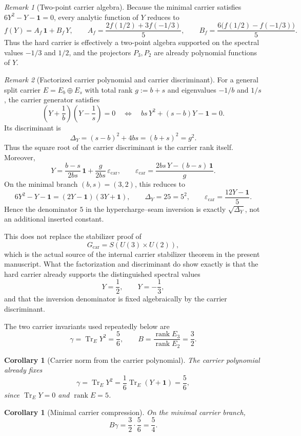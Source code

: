 \documentclass[11pt,a4paper]{article}
\newtheorem{corollary}[theorem]{Corollary}
\theoremstyle{definition}
\theoremstyle{remark}
\newtheorem*{remark}{Remark}
\DeclareMathOperator{\tr}{Tr}
\DeclareMathOperator{\rank}{rank}
\newcommand{\epscar}{\varepsilon_{\mathrm{car}}}
\begin{document}
\begin{remark}[Two-point carrier algebra]
Because the minimal carrier satisfies $6Y^2-Y-\mathbf 1=0$, every analytic function of $Y$ reduces to
\[
f(Y)=A_f\,\mathbf 1+B_f\,Y,
\qquad
A_f=\frac{2f(1/2)+3f(-1/3)}{5},
\qquad
B_f=\frac{6\bigl(f(1/2)-f(-1/3)\bigr)}{5}.
\]
Thus the hard carrier is effectively a two-point algebra supported on the spectral values $-1/3$ and $1/2$, and the projectors $P_3,P_2$ are already polynomial functions of $Y$.
\end{remark}

\begin{remark}[Factorized carrier polynomial and carrier discriminant]\label{rem:carrier-discriminant}
For a general split carrier $E=E_b\oplus E_s$ with total rank $g:=b+s$ and eigenvalues $-1/b$ and $1/s$, the carrier generator satisfies
\[
\left(Y+\frac{1}{b}\right)\left(Y-\frac{1}{s}\right)=0
\quad\Longleftrightarrow\quad
bs\,Y^2+(s-b)Y-\mathbf 1=0.
\]
Its discriminant is
\[
\Delta_Y=(s-b)^2+4bs=(b+s)^2=g^2.
\]
Thus the square root of the carrier discriminant is the carrier rank itself. Moreover,
\[
Y=\frac{b-s}{2bs}\,\mathbf 1+\frac{g}{2bs}\,\epscar,
\qquad
\epscar=\frac{2bs\,Y-(b-s)\,\mathbf 1}{g}.
\]
On the minimal branch $(b,s)=(3,2)$, this reduces to
\[
6Y^2-Y-\mathbf 1=(2Y-\mathbf 1)(3Y+\mathbf 1),
\qquad
\Delta_Y=25=5^2,
\qquad
\epscar=\frac{12Y-\mathbf 1}{5}.
\]
Hence the denominator $5$ in the hypercharge--seam inversion is exactly $\sqrt{\Delta_Y}$, not an additional inserted constant.

This does not replace the stabilizer proof of
\[
G_{\mathrm{car}}=S(U(3)\times U(2)),
\]
which is the actual source of the internal carrier stabilizer theorem in the present manuscript.
What the factorization and discriminant do show exactly is that the hard carrier already supports the distinguished spectral values
\[
Y=\frac{1}{2},
\qquad
Y=-\frac{1}{3},
\]
and that the inversion denominator is fixed algebraically by the carrier discriminant.
\end{remark}

The two carrier invariants used repeatedly below are
\[
\gamma=\tr_EY^2=\frac56,
\qquad
B=\frac{\rank E_3}{\rank E_2}=\frac32.
\]
\begin{corollary}[Carrier norm from the carrier polynomial]
The carrier polynomial already fixes
\[
\gamma=\tr_EY^2=\frac16\tr_E(Y+\mathbf 1)=\frac56,
\]
since $\tr_EY=0$ and $\rank E=5$.
\end{corollary}

\begin{corollary}[Minimal carrier compression]
\label{cor:minimal-carrier-compression}
On the minimal carrier branch,
\[
B\gamma=\frac32\cdot\frac56=\frac54.
\]
\end{corollary}
\end{document}
